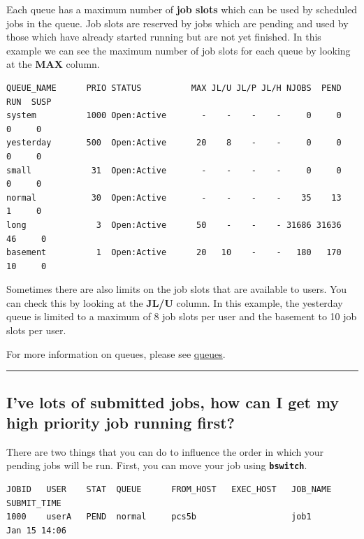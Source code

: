 \documentclass[11pt]{article}
\begin{document}
    Each queue has a maximum number of \textbf{job slots} which can be used
by scheduled jobs in the queue. Job slots are reserved by jobs which are
pending and used by those which have already started running but are not
yet finished. In this example we can see the maximum number of job slots
for each queue by looking at the \textbf{MAX} column.

    \begin{verbatim}
QUEUE_NAME      PRIO STATUS          MAX JL/U JL/P JL/H NJOBS  PEND   RUN  SUSP
system          1000 Open:Active       -    -    -    -     0     0     0     0
yesterday       500  Open:Active      20    8    -    -     0     0     0     0
small            31  Open:Active       -    -    -    -     0     0     0     0
normal           30  Open:Active       -    -    -    -    35    13     1     0
long              3  Open:Active      50    -    -    - 31686 31636    46     0
basement          1  Open:Active      20   10    -    -   180   170    10     0
\end{verbatim}

    Sometimes there are also limits on the job slots that are available to
users. You can check this by looking at the \textbf{JL/U} column. In
this example, the yesterday queue is limited to a maximum of 8 job slots
per user and the basement to 10 job slots per user.

For more information on queues, please see \href{queues.ipynb}{queues}.

    \begin{center}\rule{0.5\linewidth}{\linethickness}\end{center}

    \subsection{I've lots of submitted jobs, how can I get my high priority
job running
first?}\label{ive-lots-of-submitted-jobs-how-can-i-get-my-high-priority-job-running-first}

There are two things that you can do to influence the order in which
your pending jobs will be run. First, you can move your job using
\textbf{\texttt{bswitch}}.

    \begin{verbatim}
JOBID   USER    STAT  QUEUE      FROM_HOST   EXEC_HOST   JOB_NAME   SUBMIT_TIME
1000    userA   PEND  normal     pcs5b                   job1       Jan 15 14:06
\end{verbatim}
\end{document}
